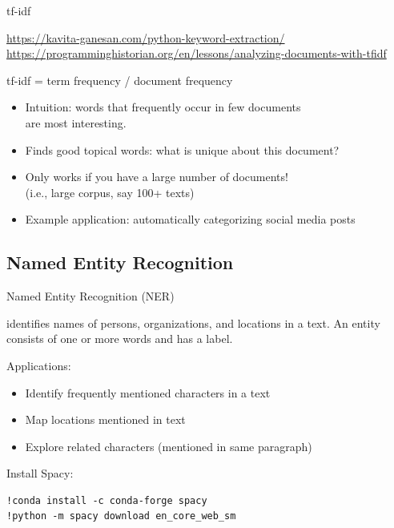 \documentclass[aspectratio=169,usenames,dvipsnames]{beamer}
\begin{document}
\begin{frame}[fragile]{tf-idf}
\begin{reference}\scriptsize
    \url{https://kavita-ganesan.com/python-keyword-extraction/}
    \url{https://programminghistorian.org/en/lessons/analyzing-documents-with-tfidf}
\end{reference}
tf-idf = term frequency / document frequency

    \begin{itemize}
        \item Intuition: words that frequently occur in few documents \\
            are most interesting.
        \item Finds good topical words: what is unique about this document?
        \item Only works if you have a large number of documents! \\
            (i.e., large corpus, say 100+ texts)
        \item Example application: automatically categorizing
            social media posts
    \end{itemize}
\end{frame}

\subsection{Named Entity Recognition}
\begin{frame}[fragile]{Named Entity Recognition (NER)}
\begin{definition}
     identifies names of persons,
    organizations, and locations in a text.
    An entity consists of one or more words and has a label.
\end{definition}
    Applications:
    \begin{itemize}
        \item Identify frequently mentioned characters in a text
        \item Map locations mentioned in text
        \item Explore related characters (mentioned in same paragraph)
    \end{itemize}
\pause

Install Spacy:
\begin{lstlisting}
!conda install -c conda-forge spacy
!python -m spacy download en_core_web_sm
\end{lstlisting}
\end{frame}
\end{document}
